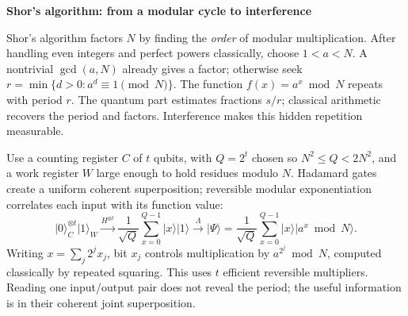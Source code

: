 \documentclass[11pt,a4paper]{article}
\newcommand{\ket}[1]{\lvert #1\rangle}
\begin{document}
{\Large\bfseries\color{ink} Shor's algorithm: from a modular cycle to interference}\par
\vspace{1pt}
Shor's algorithm factors \(N\) by finding the \emph{order} of modular multiplication. After handling even integers and perfect powers classically, choose \(1<a<N\). A nontrivial \(\gcd(a,N)\) already gives a factor; otherwise seek \(r=\min\{d>0:a^d\equiv1\pmod N\}\). The function \(f(x)=a^x\bmod N\) repeats with period \(r\). The quantum part estimates fractions \(s/r\); classical arithmetic recovers the period and factors. Interference makes this hidden repetition measurable.

Use a counting register \(C\) of \(t\) qubits, with \(Q=2^t\) chosen so \(N^2\le Q<2N^2\), and a work register \(W\) large enough to hold residues modulo \(N\). Hadamard gates create a uniform coherent superposition; reversible modular exponentiation correlates each input with its function value:
\[
\ket{0}^{\otimes t}_C\ket1_W
 \xrightarrow{H^{\otimes t}}\frac1{\sqrt Q}\sum_{x=0}^{Q-1}\ket x\ket1
 \xrightarrow{\Lambda}\ket\Psi=\frac1{\sqrt Q}\sum_{x=0}^{Q-1}\ket x\ket{a^x\bmod N}.
\]
Writing \(x=\sum_j2^jx_j\), bit \(x_j\) controls multiplication by \(a^{2^j}\bmod N\), computed classically by repeated squaring. This uses \(t\) efficient reversible multipliers. Reading one input/output pair does not reveal the period; the useful information is in their coherent joint superposition.
\end{document}
